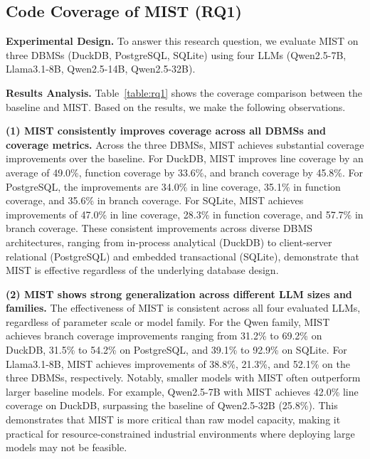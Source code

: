 
\label{sec:result}
\subsection{Code Coverage of MIST (RQ1)}

\textbf{Experimental Design.} To answer this research question, we evaluate MIST on three DBMSs (DuckDB, PostgreSQL, SQLite) using four LLMs (Qwen2.5-7B, Llama3.1-8B, Qwen2.5-14B, Qwen2.5-32B).

\textbf{Results Analysis.} Table~\ref{table:rq1} shows the coverage comparison between the baseline and MIST. Based on the results, we make the following observations.

\textbf{(1) MIST consistently improves coverage across all DBMSs and coverage metrics.} Across the three DBMSs, MIST achieves substantial coverage improvements over the baseline. For DuckDB, MIST improves line coverage by an average of 49.0\%, function coverage by 33.6\%, and branch coverage by 45.8\%. For PostgreSQL, the improvements are 34.0\% in line coverage, 35.1\% in function coverage, and 35.6\% in branch coverage. For SQLite, MIST achieves improvements of 47.0\% in line coverage, 28.3\% in function coverage, and 57.7\% in branch coverage. These consistent improvements across diverse DBMS architectures, ranging from in-process analytical (DuckDB) to client-server relational (PostgreSQL) and embedded transactional (SQLite), demonstrate that MIST is effective regardless of the underlying database design.

\textbf{(2) MIST shows strong generalization across different LLM sizes and families.} The effectiveness of MIST is consistent across all four evaluated LLMs, regardless of parameter scale or model family. For the Qwen family, MIST achieves branch coverage improvements ranging from 31.2\% to 69.2\% on DuckDB, 31.5\% to 54.2\% on PostgreSQL, and 39.1\% to 92.9\% on SQLite. For Llama3.1-8B, MIST achieves improvements of 38.8\%, 21.3\%, and 52.1\% on the three DBMSs, respectively. Notably, smaller models with MIST often outperform larger baseline models. For example, Qwen2.5-7B with MIST achieves 42.0\% line coverage on DuckDB, surpassing the baseline of Qwen2.5-32B (25.8\%). This demonstrates that MIST is more critical than raw model capacity, making it practical for resource-constrained industrial environments where deploying large models may not be feasible.


